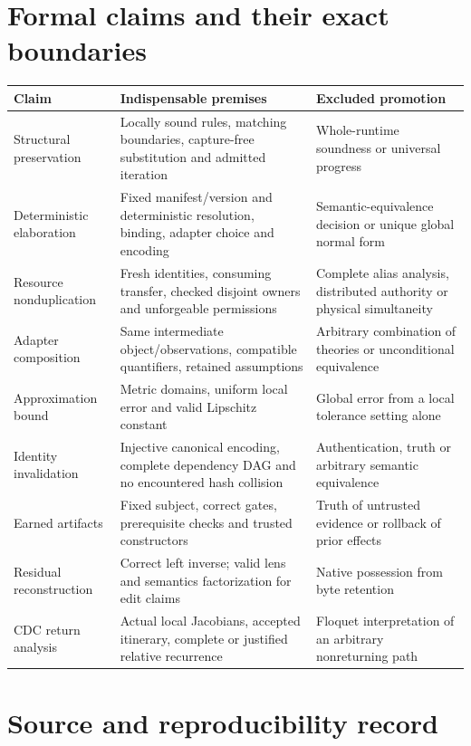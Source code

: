 \documentclass[11pt]{article}
\theoremstyle{remark}
\begin{document}
\clearpage
\section{Formal claims and their exact boundaries}

\begin{longtable}{P{.28\textwidth}P{.35\textwidth}P{.27\textwidth}}
\toprule
Claim & Indispensable premises & Excluded promotion\\
\midrule\endhead
Structural preservation & Locally sound rules, matching boundaries,
capture-free substitution and admitted iteration & Whole-runtime soundness
or universal progress\\[.6em]
Deterministic elaboration & Fixed manifest/version and deterministic
resolution, binding, adapter choice and encoding & Semantic-equivalence
decision or unique global normal form\\[.6em]
Resource nonduplication & Fresh identities, consuming transfer, checked
disjoint owners and unforgeable permissions & Complete alias analysis,
distributed authority or physical simultaneity\\[.6em]
Adapter composition & Same intermediate object/observations, compatible
quantifiers, retained assumptions & Arbitrary combination of theories or
unconditional equivalence\\[.6em]
Approximation bound & Metric domains, uniform local error and valid
Lipschitz constant & Global error from a local tolerance setting alone\\[.6em]
Identity invalidation & Injective canonical encoding, complete dependency
DAG and no encountered hash collision & Authentication, truth or arbitrary
semantic equivalence\\[.6em]
Earned artifacts & Fixed subject, correct gates, prerequisite checks and
trusted constructors & Truth of untrusted evidence or rollback of prior
effects\\[.6em]
Residual reconstruction & Correct left inverse; valid lens and semantics
factorization for edit claims & Native possession from byte retention\\[.6em]
CDC return analysis & Actual local Jacobians, accepted itinerary, complete
or justified relative recurrence & Floquet interpretation of an arbitrary
nonreturning path\\
\bottomrule
\end{longtable}

\section{Source and reproducibility record}
\end{document}
